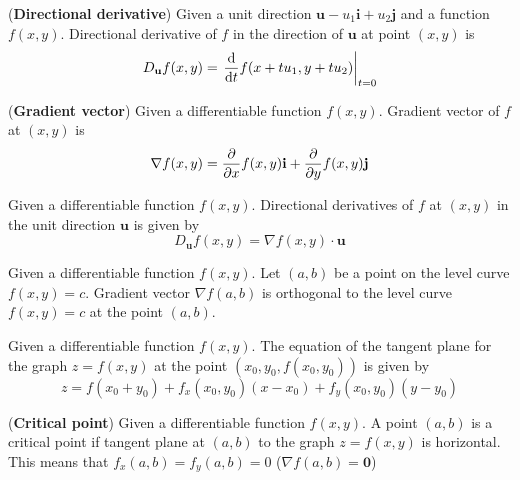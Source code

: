 \documentclass{huhtakm-template-book}
\begin{document}
\begin{defn}(\textbf{Directional derivative})
    Given a unit direction $\mathbf{u}-u_{1}\mathbf{i}+u_{2}\mathbf{j}$ and a function $f(x,y)$. Directional derivative of $f$ in the direction of $\mathbf{u}$ at point $(x,y)$ is
    \begin{equation*}
        D_{\mathbf{u}}f(x,y)=\left.\odv{}{t}f(x+tu_{1},y+tu_{2})\right|_{t=0}
    \end{equation*}
\end{defn}
\begin{defn}(\textbf{Gradient vector})
    Given a differentiable function $f(x,y)$. Gradient vector of $f$ at $(x,y)$ is
    \begin{equation*}
        \nabla f(x,y)=\pdv*{f(x,y)}{x}\mathbf{i}+\pdv*{f(x,y)}{y}\mathbf{j}
    \end{equation*}
\end{defn}
\begin{thm}
    Given a differentiable function $f(x,y)$. Directional derivatives of $f$ at $(x,y)$ in the unit direction $\mathbf{u}$ is given by
    \begin{equation*}
        D_{\mathbf{u}}f(x,y)=\nabla f(x,y)\cdot\mathbf{u}
    \end{equation*}
\end{thm}
\begin{thm}
    Given a differentiable function $f(x,y)$. Let $(a,b)$ be a point on the level curve $f(x,y)=c$. Gradient vector $\nabla f(a,b)$ is orthogonal to the level curve $f(x,y)=c$ at the point $(a,b)$.
\end{thm}
\begin{thm}
    Given a differentiable function $f(x,y)$. The equation of the tangent plane for the graph $z=f(x,y)$ at the point $(x_{0},y_{0},f(x_{0},y_{0}))$ is given by
    \begin{equation*}
        z=f(x_{0}+y_{0})+f_{x}(x_{0},y_{0})(x-x_{0})+f_{y}(x_{0},y_{0})(y-y_{0})
    \end{equation*}
\end{thm}
\begin{defn}(\textbf{Critical point})
    Given a differentiable function $f(x,y)$. A point $(a,b)$ is a critical point if tangent plane at $(a,b)$ to the graph $z=f(x,y)$ is horizontal. This means that $f_{x}(a,b)=f_{y}(a,b)=0$ ($\nabla f(a,b)=\mathbf{0}$)
\end{defn}
\end{document}
